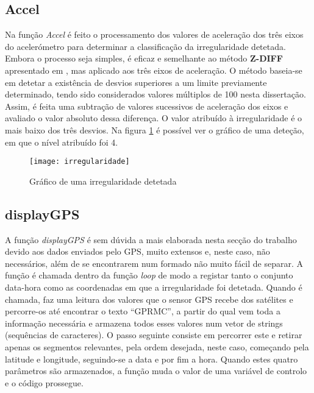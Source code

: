 \subsection{Accel}
\label{sub:accel}

Na função \emph{Accel} é feito o processamento dos valores de aceleração dos três eixos do acelerómetro para determinar a classificação da irregularidade detetada.
Embora o processo seja simples, é eficaz e semelhante ao método \textbf{Z-DIFF} apresentado em \cite{Mednis2011}, mas aplicado aos três eixos de aceleração.
O método baseia-se em detetar a existência de desvios superiores a um limite previamente determinado, tendo sido considerados valores múltiplos de 100 nesta dissertação.
Assim, é feita uma subtração de valores sucessivos de aceleração dos eixos e avaliado o valor absoluto dessa diferença.
O valor atribuído à irregularidade é o mais baixo dos três desvios.
Na figura \ref{fig:grafico_de_uma_irregularidade_detetada} é possível ver o gráfico de uma deteção, em que o nível atribuído foi 4.

\begin{figure}[hbtp]
	\centering
	\texttt{[image: irregularidade]}
	\caption{Gráfico de uma irregularidade detetada}
	\label{fig:grafico_de_uma_irregularidade_detetada}
\end{figure}

\subsection{displayGPS}
\label{sub:displayGPS}

A função \emph{displayGPS} é sem dúvida a mais elaborada nesta secção do trabalho devido aos dados enviados pelo GPS, muito extensos e, neste caso, não necessários, além de se encontrarem num formado não muito fácil de separar.
A função é chamada dentro da função \emph{loop} de modo a registar tanto o conjunto data-hora como as coordenadas em que a irregularidade foi detetada.
Quando é chamada, faz uma leitura dos valores que o sensor GPS recebe dos satélites e percorre-os até encontrar o texto ``GPRMC'', a partir do qual vem toda a informação necessária e armazena todos esses valores num vetor de strings (sequências de caracteres).
O passo seguinte consiste em percorrer este  e retirar apenas os segmentos relevantes, pela ordem desejada, neste caso, começando pela latitude e longitude, seguindo-se a data e por fim a hora.
Quando estes quatro parâmetros são armazenados, a função muda o valor de uma variável de controlo e o código prossegue.

